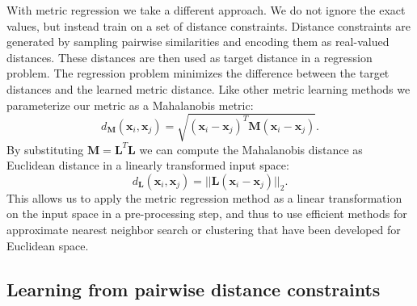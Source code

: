 \documentclass[a4paper,titlepage]{article}
\renewcommand{\vec}[1]{\mathbf{#1}}
\newcommand{\mat}[1]{\mathbf{#1}}
\begin{document}
With metric regression we take a different approach. We do not ignore the exact values, but instead train on a set of distance constraints. Distance constraints are generated by sampling pairwise similarities and encoding them as real-valued distances. These distances are then used as target distance in a regression problem. The regression problem minimizes the difference between the target distances and the learned metric distance. Like other metric learning methods we parameterize our metric as a Mahalanobis metric:  
\begin{equation}
d_{\mat{M}}(\vec{x}_i, \vec{x}_j) = \sqrt{(\vec{x}_i-\vec{x}_j)^T \mat{M} (\vec{x}_i - \vec{x}_j)}.
\label{eq:mahalanobis}
\end{equation}
By substituting $\mat{M} = \mat{L}^T \mat{L}$ we can compute the Mahalanobis distance as Euclidean distance in a linearly transformed input space:
\begin{equation}
d_{\mat{L}}(\vec{x}_i, \vec{x}_j) =  ||\mat{L} (\vec{x}_i - \vec{x}_j)||_2.
\label{eq:mahalanobis_transformation}
\end{equation}
This allows us to apply the metric regression method as a linear transformation on the input space in a pre-processing step, and thus to use efficient methods for approximate nearest neighbor search or clustering that have been developed for Euclidean space. %


\subsection{Learning from pairwise distance constraints}

\end{document}
